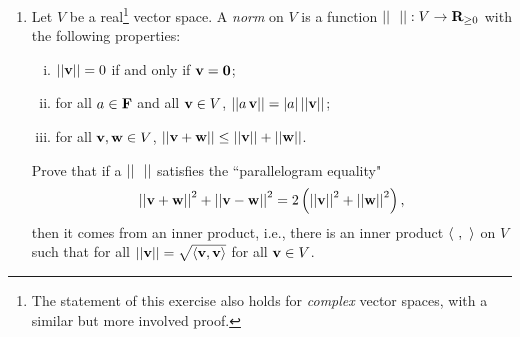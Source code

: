 \documentclass[11pt]{amsart}
\begin{document}
\begin{enumerate}[(1)]
\item Let $V$ be a real\footnote{The statement of this exercise also holds for \emph{complex} vector spaces, with a similar but more involved proof.} vector space.
A \emph{norm} on $V$ is a function $\left|\left| \ \  \right|\right| : V \to \mathbf{R}_{ \ge 0 }$ with the following properties:
  \begin{enumerate}[(i)]
  \item $\left|\left| \mathbf v \right|\right| = 0$ if and only if $\mathbf v = \mathbf 0$;
  \item for all $a \in \mathbf{F}$ and all $\mathbf v \in V$, $\left|\left| a \, \mathbf v \right|\right| = |a| \left|\left| \mathbf v \right|\right|$;
  \item for all $\mathbf v, \mathbf w \in V$, $\left|\left| \mathbf v + \mathbf w \right|\right| \le \left|\left| \mathbf v \right|\right| + \left|\left| \mathbf w \right|\right|$.
  \end{enumerate}
Prove that if a $\left|\left| \ \  \right|\right|$ satisfies the ``parallelogram equality"
\[
  \left|\left|  \mathbf v + \mathbf w  \right|\right|^2 + \left|\left|  \mathbf v - \mathbf w  \right|\right|^2 = 2 \left( \left|\left|  \mathbf v  \right|\right|^2 + \left|\left|  \mathbf w  \right|\right|^2 \right) ,
\]
then it comes from an inner product, i.e., there is an inner product $\left< \ , \  \right>$ on $V$ such that for all $\left|\left| \mathbf v \right|\right| = \sqrt{ \left< \mathbf v, \mathbf v \right> }$ for all $\mathbf v \in V$.


\end{enumerate}
\end{document}
